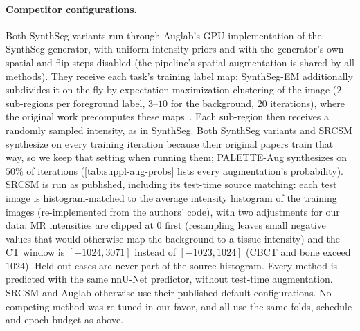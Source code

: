 \paragraph{Competitor configurations.} Both SynthSeg variants run through
Auglab's GPU implementation of the SynthSeg generator, with uniform intensity
priors and with the generator's own spatial and flip steps disabled (the
pipeline's spatial augmentation is shared by all methods). They receive each
task's training label map; SynthSeg-EM additionally subdivides it on the fly
by expectation-maximization clustering of the image ($2$ sub-regions per
foreground label, $3$--$10$ for the background, $20$ iterations), where the
original work precomputes these maps~\cite[\S5.4]{billot2023synthseg}. Each
sub-region then receives a randomly sampled intensity, as in SynthSeg. Both
SynthSeg variants and SRCSM synthesize on every training iteration because
their original papers train that way, so we keep that setting when running
them; PALETTE-Aug synthesizes on $50\%$ of iterations
(\cref{tab:suppl-aug-probs} lists every augmentation's probability). SRCSM is run as
published, including its test-time source matching: each test image is
histogram-matched to the average intensity histogram of the training images
(re-implemented from the authors' code), with two adjustments for our data:
MR intensities are clipped at $0$ first (resampling leaves small negative
values that would otherwise map the background to a tissue intensity) and the
CT window is $[-1024, 3071]$ instead of $[-1023, 1024]$ (CBCT and bone exceed
$1024$). Held-out cases are never part of the source histogram. Every method is
predicted with the same nnU-Net predictor, without test-time augmentation. SRCSM and Auglab otherwise use their published default
configurations. No competing method was re-tuned in our favor, and all use
the same folds, schedule and epoch budget as above.

